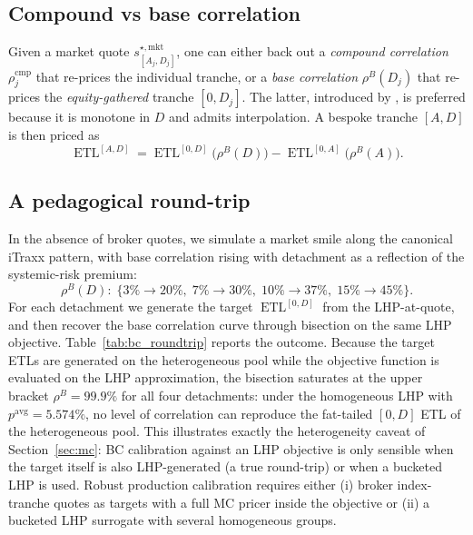 \documentclass[11pt,a4paper]{article}
\newcommand{\1}{\mathbf{1}}
\DeclareMathOperator{\ETL}{ETL}
\begin{document}
\subsection{Compound vs base correlation}
Given a market quote \(s^{\star,\mathrm{mkt}}_{[A_{j},D_{j}]}\), one
can either back out a \emph{compound correlation}
\(\rho^{\mathrm{cmp}}_{j}\) that re-prices the individual tranche, or
a \emph{base correlation}
\(\rho^{B}(D_{j})\) that re-prices the \emph{equity-gathered} tranche
\([0,D_{j}]\).  The latter, introduced by \citet{jpmorgan2004}, is
preferred because it is monotone in \(D\) and admits interpolation.
A bespoke tranche \([A,D]\) is then priced as
\begin{equation}
\ETL^{[A,D]}
= \ETL^{[0,D]}\!\bigl(\rho^{B}(D)\bigr)
- \ETL^{[0,A]}\!\bigl(\rho^{B}(A)\bigr).
\label{eq:bespoke_etl}
\end{equation}

\subsection{A pedagogical round-trip}
In the absence of broker quotes, we simulate a market smile along
the canonical iTraxx pattern, with base correlation rising with
detachment as a reflection of the systemic-risk premium:
\begin{equation}
\rho^{B}(D):\;
\{3\%\!\to\!20\%,\;7\%\!\to\!30\%,\;10\%\!\to\!37\%,\;15\%\!\to\!45\%\}.
\label{eq:bc_quote}
\end{equation}
For each detachment we generate the target
\(\ETL^{[0,D]}\) from the LHP-at-quote, and then recover the base
correlation curve through bisection on the same LHP objective.
Table~\ref{tab:bc_roundtrip} reports the outcome.  Because the
target ETLs are generated on the heterogeneous pool while the
objective function is evaluated on the LHP approximation, the
bisection saturates at the upper bracket \(\rho^{B}=99.9\%\) for
all four detachments: under the homogeneous LHP with
\(p^{\text{avg}}=5.574\%\), no level of correlation can reproduce
the fat-tailed \([0,D]\) ETL of the heterogeneous pool. This
illustrates exactly the heterogeneity caveat of
Section~\ref{sec:mc}: BC calibration against an LHP objective is
only sensible when the target itself is also LHP-generated (a true
round-trip) or when a bucketed LHP is used.  Robust production
calibration requires either (i) broker index-tranche quotes as
targets with a full MC pricer inside the objective or (ii) a
bucketed LHP surrogate with several homogeneous groups.
\end{document}
